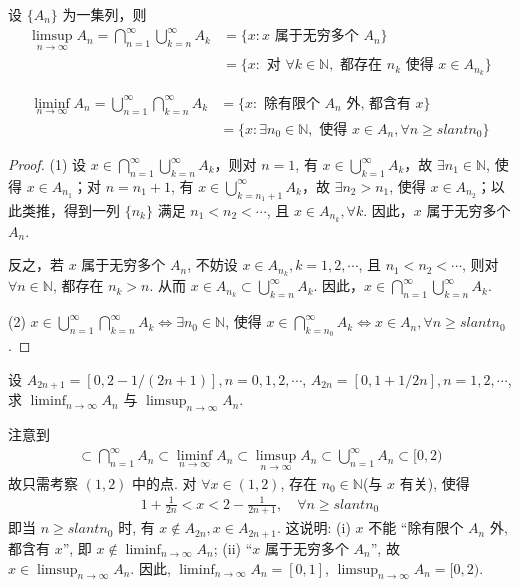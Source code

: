 \documentclass[../../main.tex]{subfiles}
\begin{document}
\begin{proposition}
设 $\{A_n\}$ 为一集列，则
\begin{align*}
\limsup_{n \to \infty} A_n = \bigcap_{n = 1}^{\infty} \bigcup_{k = n}^{\infty} A_k 
&= \{x: x \text{ 属于无穷多个 } A_n\}\\
&= \{x: \text{ 对 } \forall k \in \mathbb{N}, \text{ 都存在 } n_k \text{ 使得 } x \in A_{n_k}\}
\end{align*}

\begin{align*}
\liminf_{n \to \infty} A_n = \bigcup_{n = 1}^{\infty} \bigcap_{k = n}^{\infty} A_k 
&= \{x: \text{ 除有限个 } A_n \text{ 外, 都含有 } x\}\\
&= \{x: \exists n_0 \in \mathbb{N}, \text{ 使得 } x \in A_n, \forall n \geqslant slant n_0\}
\end{align*}
\end{proposition}
\begin{proof}
(1) 设 $x \in \bigcap_{n = 1}^{\infty} \bigcup_{k = n}^{\infty} A_k$，则对 $n = 1$, 有 $x \in \bigcup_{k = 1}^{\infty} A_k$，故 $\exists n_1 \in \mathbb{N}$, 使得 $x \in A_{n_1}$；对 $n = n_1 + 1$, 有 $x \in \bigcup_{k = n_1 + 1}^{\infty} A_k$，故 $\exists n_2 > n_1$, 使得 $x \in A_{n_2}$；以此类推，得到一列 $\{n_k\}$ 满足 $n_1 < n_2 < \cdots$, 且 $x \in A_{n_k}, \forall k$. 因此，$x$ 属于无穷多个 $A_n$.

反之，若 $x$ 属于无穷多个 $A_n$, 不妨设 $x \in A_{n_k}, k = 1, 2, \cdots$, 且 $n_1 < n_2 < \cdots$, 则对 $\forall n \in \mathbb{N}$, 都存在 $n_k > n$. 从而 $x \in A_{n_k} \subset \bigcup_{k = n}^{\infty} A_k$. 因此，$x \in \bigcap_{n = 1}^{\infty} \bigcup_{k = n}^{\infty} A_k$.

(2) $x \in \bigcup_{n = 1}^{\infty} \bigcap_{k = n}^{\infty} A_k \Longleftrightarrow \exists n_0 \in \mathbb{N}$, 使得 $x \in \bigcap_{k = n_0}^{\infty} A_k \Longleftrightarrow x \in A_n, \forall n \geqslant slant n_0$. 
\end{proof}

\begin{example}
设 $A_{2n + 1} = [0, 2 - 1/(2n + 1)], n = 0, 1, 2, \cdots$, $A_{2n} = [0, 1 + 1/2n], n = 1, 2, \cdots$, 求 $\liminf_{n \to \infty} A_n$ 与 $\limsup_{n \to \infty} A_n$.
\end{example}
\begin{solution}
注意到
\begin{align*}
[0, 1] \subset \bigcap_{n = 1}^{\infty} A_n \subset \liminf_{n \to \infty} A_n \subset \limsup_{n \to \infty} A_n \subset \bigcup_{n = 1}^{\infty} A_n \subset [0, 2)
\end{align*}
故只需考察 $(1, 2)$ 中的点. 对 $\forall x \in (1, 2)$, 存在 $n_0 \in \mathbb{N}$(与 $x$ 有关), 使得
\begin{align*}
1 + \frac{1}{2n} < x < 2 - \frac{1}{2n + 1}, \quad \forall n \geqslant slant n_0
\end{align*}
即当 $n \geqslant slant n_0$ 时, 有 $x \notin A_{2n}, x \in A_{2n + 1}$. 这说明: (i) $x$ 不能 “除有限个 $A_n$ 外, 都含有 $x$”, 即 $x \notin \liminf_{n \to \infty} A_n$; (ii) “$x$ 属于无穷多个 $A_n$”, 故 $x \in \limsup_{n \to \infty} A_n$. 因此, $\liminf_{n \to \infty} A_n = [0, 1]$, $\limsup_{n \to \infty} A_n = [0, 2)$.
\end{solution}
\end{document}
